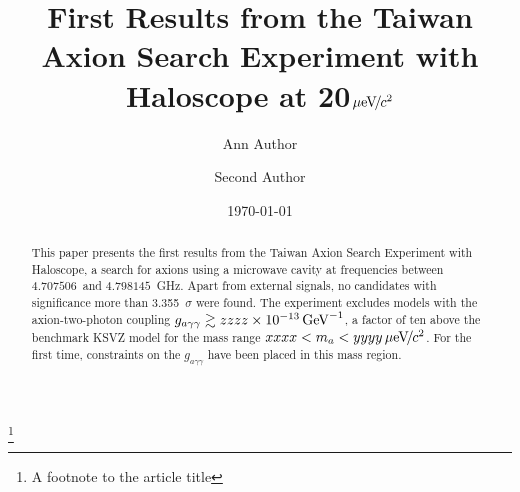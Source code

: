\documentclass[%
preprint, %
 amsmath,amssymb,
 aps,
]{revtex4-2}
\newcommand{\gagg}{\ensuremath{g_{a\gamma\gamma}}}
\newcommand{\ma}{\ensuremath{m_a}}
\newcommand{\muevcc}{\ensuremath{\,\mu\text{e\hspace{-.08em}V\hspace{-0.16em}/\hspace{-0.08em}}c^2}}
\newcommand{\GeVinv}{\ensuremath{\,\text{Ge\hspace{-.08em}V}^{-1}}}
\newcommand{\flo}{\ensuremath{4.707506}}
\newcommand{\fhi}{\ensuremath{4.798145}}
\newcommand{\mlo}{\ensuremath{xxxx}}
\newcommand{\mhi}{\ensuremath{yyyy}}
\newcommand{\avelimit}{\ensuremath{zzzz\times 10^{-13}}}
\begin{document}

\title{First Results from the Taiwan Axion Search Experiment with Haloscope at 20\muevcc}%
\thanks{A footnote to the article title}%

\author{Ann Author}
\author{Second Author}%
%



\date{\today}%

\begin{abstract}

 This paper presents the first results from the 
Taiwan Axion Search Experiment with Haloscope, a search for axions 
using a microwave cavity at frequencies between \flo\ and \fhi~GHz. 
Apart from external signals, no candidates with significance more than 
3.355~$\sigma$ were found. The experiment excludes models with the axion-two-photon 
coupling $\gagg\gtrsim \avelimit\GeVinv$, a factor of ten above the benchmark 
KSVZ model for the mass range $\mlo < \ma < \mhi \muevcc$. For the first time, 
constraints on the $\gagg$ have been placed in this mass region. 


\end{abstract}

\maketitle

\tableofcontents









\begin{acknowledgments}

\end{acknowledgments}

\appendix



\end{document}
